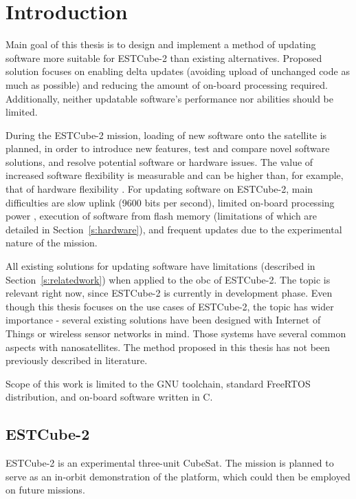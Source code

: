 \newpage
\section{Introduction}

Main goal of this thesis is to design and implement a method of updating software more suitable for ESTCube-2 than existing alternatives. Proposed solution focuses on enabling delta updates (avoiding upload of unchanged code as much as possible) and reducing the amount of on-board processing required. Additionally, neither updatable software’s performance nor abilities should be limited.

During the ESTCube-2 mission, loading of new software onto the satellite is planned, in order to introduce new features, test and compare novel software solutions, and resolve potential software or hardware issues. The value of increased software flexibility is measurable and can be higher than, for example, that of hardware flexibility \cite{Nilchiani2009}. For updating software on ESTCube-2, main difficulties are slow uplink (9600 bits per second), limited on-board processing power \cite{Ehrpais2016}, execution of software from flash memory \cite{Haljaste2017} (limitations of which are detailed in Section~\ref{s:hardware}), and frequent updates due to the experimental nature of the mission.

All existing solutions for updating software have limitations (described in Section~\ref{s:relatedwork}) when applied to the \gls{obc} of ESTCube-2. The topic is relevant right now, since ESTCube-2 is currently in development phase. Even though this thesis focuses on the use cases of ESTCube-2, the topic has wider importance - several existing solutions have been designed with Internet of Things or wireless sensor networks \cite{Dunkels2006,Han2005} in mind. Those systems have several common aspects with nanosatellites. The method proposed in this thesis has not been previously described in literature.

Scope of this work is limited to the GNU toolchain, standard FreeRTOS distribution, and on-board software written in C.

\subsection{ESTCube-2}

ESTCube-2 is an experimental three-unit CubeSat. The mission is planned to serve as an in-orbit demonstration of the platform, which could then be employed on future missions. \cite{Iakubivskyi2016}

